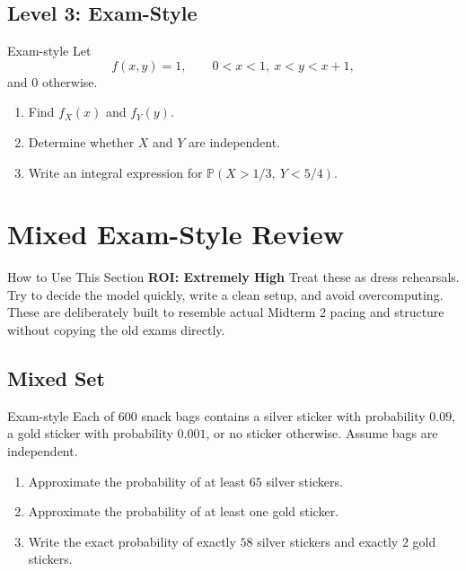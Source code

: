 \documentclass[12pt]{article}
\newcommand{\PP}{\mathbb{P}}
\newcommand{\writespace}[1]{\vspace*{#1}}
\newcommand{\xlongws}{\writespace{4.1cm}}
\newcommand{\roiline}[1]{\textbf{ROI: #1}}
\newcounter{problem}[section]
\begin{document}
\subsection*{Level 3: Exam-Style}

\begin{practiceproblem}{Exam-style}
Let
\[
  f(x,y)=1,\qquad 0<x<1,\ x<y<x+1,
\]
and $0$ otherwise.
\begin{enumerate}
  \item Find $f_X(x)$ and $f_Y(y)$.
  \item Determine whether $X$ and $Y$ are independent.
  \item Write an integral expression for $\PP(X>1/3,\ Y<5/4)$.
\end{enumerate}
\end{practiceproblem}
\xlongws

\clearpage

\section{Mixed Exam-Style Review}

\begin{summarybox}{How to Use This Section}
\roiline{Extremely High}
Treat these as dress rehearsals. Try to decide the model quickly, write a clean setup, and avoid overcomputing. These are deliberately built to resemble actual Midterm 2 pacing and structure without copying the old exams directly.
\end{summarybox}

\subsection*{Mixed Set}

\begin{practiceproblem}{Exam-style}
Each of $600$ snack bags contains a silver sticker with probability $0.09$, a gold sticker with probability $0.001$, or no sticker otherwise. Assume bags are independent.
\begin{enumerate}
  \item Approximate the probability of at least $65$ silver stickers.
  \item Approximate the probability of at least one gold sticker.
  \item Write the exact probability of exactly $58$ silver stickers and exactly $2$ gold stickers.
\end{enumerate}
\end{practiceproblem}
\xlongws
\end{document}
